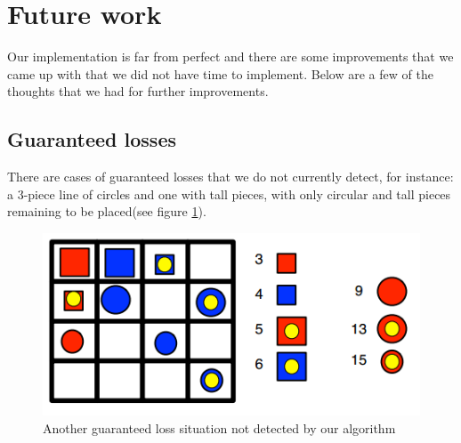 \section{Future work}\label{future work}
Our implementation is far from perfect and there are some improvements
that we came up with that we did not have time to implement. Below
are a few of the thoughts that we had for further improvements.

\subsection{Guaranteed losses}
There are cases of guaranteed losses that we do not currently detect, for 
instance: a 3-piece line of circles and one with tall pieces, with only 
circular and tall pieces remaining to be placed(see figure \ref{fig:gloss2}).

\begin{figure}
	\includegraphics{pictures/gloss2.png}
	\caption{Another guaranteed loss situation not detected by
	our algorithm}
	\label{fig:gloss2}
\end{figure}
